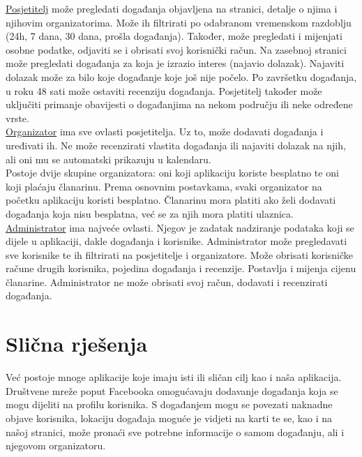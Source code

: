 			\underline{Posjetitelj} može pregledati događanja objavljena na stranici, detalje o njima i njihovim organizatorima. Može ih filtrirati po odabranom vremenskom razdoblju (24h, 7 dana, 30 dana, prošla događanja). Također, može pregledati i mijenjati osobne podatke, odjaviti se i obrisati svoj korisnički račun. Na zasebnoj stranici može pregledati događanja za koja je izrazio interes (najavio dolazak). Najaviti dolazak može za bilo koje događanje koje još nije počelo. Po završetku događanja, u roku 48 sati može ostaviti recenziju događanja. Posjetitelj također može uključiti primanje obavijesti o događanjima na nekom području ili neke određene vrste. \\
			
			\underline{Organizator} ima sve ovlasti posjetitelja. Uz to, može dodavati događanja i uređivati ih. Ne može recenzirati vlastita događanja ili najaviti dolazak na njih, ali oni mu se automatski prikazuju u kalendaru.\\
			Postoje dvije skupine organizatora: oni koji aplikaciju koriste besplatno te oni koji plaćaju članarinu. Prema osnovnim postavkama, svaki organizator na početku aplikaciju koristi besplatno. Članarinu mora platiti ako želi dodavati događanja koja nisu besplatna, već se za njih mora platiti ulaznica. \\
			
			\underline{Administrator} ima najveće ovlasti. Njegov je zadatak nadziranje podataka koji se dijele u aplikaciji, dakle događanja i korisnike. Administrator može pregledavati sve korisnike te ih filtrirati na posjetitelje i organizatore. Može obrisati korisničke račune drugih korisnika, pojedina događanja i recenzije. Postavlja i mijenja cijenu članarine. Administrator ne može obrisati svoj račun, dodavati i recenzirati događanja. 
		
		\section{Slična rješenja}
		
		 Već postoje mnoge aplikacije koje imaju isti ili sličan cilj kao i naša aplikacija. Društvene mreže poput Facebooka omogućavaju dodavanje događanja koja se mogu dijeliti na profilu korisnika. S događanjem mogu se povezati naknadne objave korisnika, lokaciju događaja moguće je vidjeti na karti te se, kao i na našoj stranici, može pronaći sve potrebne informacije o samom događanju, ali i njegovom organizatoru. 
		 
